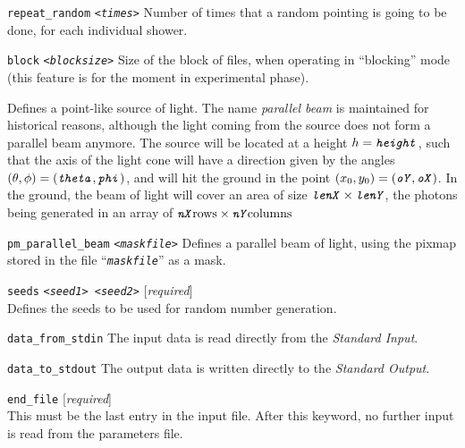 \begin{Uentry}
\item[\texttt{repeat\_random} \quad \texttt{<\emph{times}>}]
%
  Number of times that a random pointing is going to be done, for each
  individual shower.

\item[\texttt{block} \quad
  \texttt{<\emph{blocksize}>}]
%
  Size of the block of files, when operating in ``blocking'' mode
  (this feature is for the moment in experimental phase).

\item[\texttt{parallel\_beam} \quad
  \texttt{
    <\emph{theta}>  <\emph{phi}>  %
    <\emph{oX}>  <\emph{oY}>  %
    <\emph{lenX}>  <\emph{lenY}>  %
    <\emph{nX}>  <\emph{nY}>  %
    <\emph{height}>}]
%
  Defines a point-like source of light. The name \emph{parallel beam}
  is maintained for historical reasons, although the light coming from
  the source does not form a parallel beam anymore. The source will be
  located at a height $h=\texttt{\emph{height}}$, such that the axis
  of the light cone will have a direction given by the angles
  $(\theta,\phi)=(\texttt{\emph{theta}},\texttt{\emph{phi}})$, and
  will hit the ground in the point
  $(x_0,y_0)=(\texttt{\emph{oY}},\texttt{\emph{oX}})$. In the ground,
  the beam of light will cover an area of size $\texttt{\emph{lenX}}
  \times \texttt{\emph{lenY}}$, the photons being generated in an
  array of $\texttt{\emph{nX}} \text{rows} \times
  \texttt{\emph{nY}} \text{columns}$

\item[\texttt{pm\_parallel\_beam} \quad
  \texttt{<\emph{maskfile}>}]
%
  Defines a parallel beam of light, using the pixmap stored in the
  file ``\texttt{\emph{maskfile}}'' as a mask.

\item[\texttt{seeds} \quad
  \texttt{<\emph{seed1}>  <\emph{seed2}>}]
%
  [\emph{required}] \\
  Defines the seeds to be used for random number generation.

\item[\texttt{data\_from\_stdin}]
%
  The input data is read directly from the \emph{Standard Input}.
  
\item[\texttt{data\_to\_stdout}]
%
  The output data is written directly to the \emph{Standard Output}.

\item[\texttt{end\_file}]
%
  [\emph{required}] \\
  This must be the last entry in the input file. After this keyword,
  no further input is read from the parameters file.

\end{Uentry}

